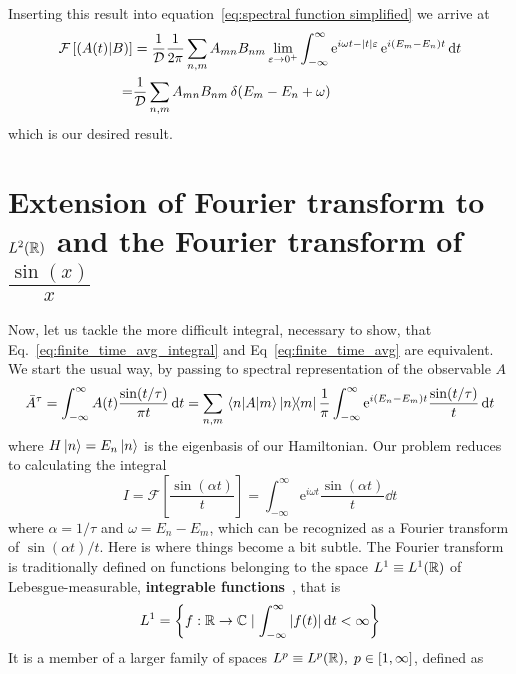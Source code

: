 Inserting this result into equation~\eqref{eq:spectral function simplified} we arrive at
\begin{align}
    \mathcal{F}\left[\left(A(t) \middle| B\right)\right] & = \frac{1}{\mathcal{D}} \frac{1}{2 \pi}\sum_{n,m} A_{mn} B_{nm}
    \lim _{\varepsilon \to 0^+} \int_{-\infty}^{\infty} \mathrm{e}^{i \omega t-|t|
    \varepsilon}\,\mathrm{e}^{i (E_m-E_n) t} \dd{t} \nonumber                                                             \\
    =                                    & \frac{1}{\mathcal{D}}\sum_{n,m} A_{mn} B_{nm}\, \delta(E_m-E_n+\omega)
\end{align}
which is our desired result.

\section{Extension of Fourier transform to \(L^2(\mathbb{R})\) and the Fourier transform of \(\frac{\sin(x)}{x}\)}
Now, let us tackle the more difficult integral, necessary to show, that Eq.~\eqref{eq:finite_time_avg_integral}
and Eq~\eqref{eq:finite_time_avg} are equivalent. We start the usual way, by passing to spectral representation
of the observable \(A\)
\begin{equation}
    \bar{A}^{\tau} = \int_{-\infty}^{\infty}  A(t) \frac{\sin (t/\tau )}{\pi t} \dd{t}
    = \sum_{n,m}  \matrixel{n}{A}{m} \ketbra{n}{m} \frac{1}{\pi } \int_{-\infty}^{\infty}
    \mathrm{e}^{i (E_n-E_m) t} \frac{\sin (t/\tau )}{t}\dd{t}
    \label{eq:b1}
\end{equation}
where \(H\ket{n} = E_n \ket{n}\) is the eigenbasis of our Hamiltonian. Our problem reduces to calculating
the integral
\begin{equation}
    I =\mathcal{F}\left[ \frac{\sin (\alpha t)}{t} \right]=  \int_{-\infty}^{\infty} \mathrm{e}^{i \omega  t} \frac{\sin (\alpha  t )}{t}\dd{t}
\end{equation}
where \(\alpha = 1/\tau\) and \(\omega = E_n-E_m\), which can be recognized as a Fourier transform of
\(\sin (\alpha  t )/t\). Here is where things become a bit subtle. The Fourier transform is traditionally
defined on functions belonging to the space \(L^1 \equiv L^1(\mathbb{R})\) of Lebesgue-measurable, \textbf{integrable
    functions}~\autocite{Rudin1987}, that is
\begin{equation}
    L^1 = \left\{f:\mathbb{R} \to \mathbb{C} \mid \int_{-\infty}^{\infty} |f(t)|\dd{t}  < \infty \right\}
\end{equation}
It is a member of a larger family of spaces \(L^p \equiv L^p(\mathbb{R}),\; p \in \left[ 1,\infty  \right] \), defined as
